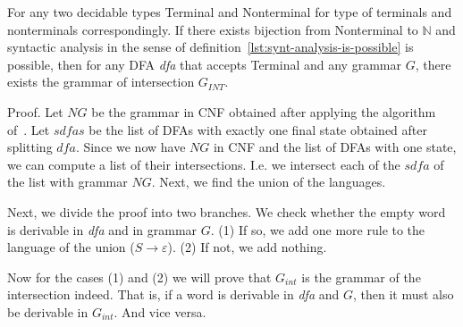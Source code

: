 

\begin{theorem}
    For any two decidable types Terminal and Nonterminal for type of terminals and nonterminals correspondingly. If there exists bijection from Nonterminal to $\mathbb{N}$ and syntactic analysis in the sense of definition~\ref{lst:synt-analysis-is-possible} is possible, then for any DFA \textit{dfa} that accepts Terminal and any grammar $G$, there exists the grammar of intersection $G_{INT}$.
\end{theorem}   

Proof. 
Let $NG$ be the grammar in CNF obtained after applying the algorithm of~\cite{smolkaHofmann2016}. Let $sdfas$ be the list of DFAs with exactly one final state obtained after splitting $dfa$.
Since we now have $NG$ in CNF and the list of DFAs with one state, we can compute a list of their intersections.
I.e. we intersect each of the $sdfa$ of the list with grammar $NG$.
Next, we find the union of the languages. 

Next, we divide the proof into two branches.
We check whether the empty word is derivable in \textit{dfa} and in grammar $G$.
(1) If so, we add one more rule to the language of the union ($ S \to \varepsilon$). (2) If not, we add nothing.

Now for the cases (1) and (2) we will prove that $G_{int}$ is the grammar of the intersection indeed.
That is, if a word is derivable in \textit{dfa} and $G$, then it must also be derivable in $G_{int}$. And vice versa.

